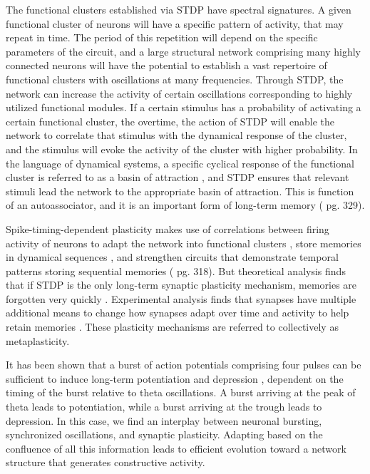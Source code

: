 \documentclass[twocolumn]{article}
\begin{document}
The functional clusters established via STDP have spectral signatures. A given functional cluster of neurons will have a specific pattern of activity, that may repeat in time. The period of this repetition will depend on the specific parameters of the circuit, and a large structural network comprising many highly connected neurons will have the potential to establish a vast repertoire of functional clusters with oscillations at many frequencies. Through STDP, the network can increase the activity of certain oscillations corresponding to highly utilized functional modules. If a certain stimulus has a probability of activating a certain functional cluster, the overtime, the action of STDP will enable the network to correlate that stimulus with the dynamical response of the cluster, and the stimulus will evoke the activity of the cluster with higher probability. In the language of dynamical systems, a specific cyclical response of the functional cluster is referred to as a basin of attraction \cite{iz2007,st2015}, and STDP ensures that relevant stimuli lead the network to the appropriate basin of attraction. This is function of an autoassociator, and it is an important form of long-term memory (\cite{bu2006} pg. 329).

Spike-timing-dependent plasticity makes use of correlations between firing activity of neurons to adapt the network into functional clusters \cite{shki2006}, store memories in dynamical sequences \cite{haah2015}, and strengthen circuits that demonstrate temporal patterns storing sequential memories (\cite{bu2006} pg. 318). But theoretical analysis finds that if STDP is the only long-term synaptic plasticity mechanism, memories are forgotten very quickly \cite{fuab2007}. Experimental analysis finds that synapses have multiple additional means to change how synapses adapt over time and activity to help retain memories \cite{ab2008}. These plasticity mechanisms are referred to collectively as metaplasticity.

It has been shown that a burst of action potentials comprising four pulses can be sufficient to induce long-term potentiation and depression \cite{huli1995}, dependent on the timing of the burst relative to theta oscillations. A burst arriving at the peak of theta leads to potentiation, while a burst arriving at the trough leads to depression. In this case, we find an interplay between neuronal bursting, synchronized oscillations, and synaptic plasticity. Adapting based on the confluence of all this information leads to efficient evolution toward a network structure that generates constructive activity.
\end{document}

